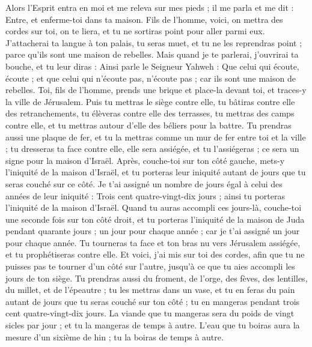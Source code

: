 \begin{multicols}{2}
Alors l'Esprit entra en moi et me releva sur mes pieds ; il me parla et me dit : Entre, et enferme-toi dans ta maison.
Fils de l’homme, voici, on mettra des cordes sur toi, on te liera, et tu ne sortiras point pour aller parmi eux.
J’attacherai ta langue à ton palais, tu seras muet, et tu ne les reprendras point ; parce qu'ils sont une maison de rebelles.
Mais quand je te parlerai, j'ouvrirai ta bouche, et tu leur diras : Ainsi parle le Seigneur Yahweh : Que celui qui écoute, écoute ; et que celui qui n'écoute pas, n'écoute pas ; car ils sont une maison de rebelles.
\VerseOne{}Toi, fils de l’homme, prends une brique et place-la devant toi, et traces-y la ville de Jérusalem.
Puis tu mettras le siège contre elle, tu bâtiras contre elle des retranchements, tu élèveras contre elle des terrasses, tu mettras des camps contre elle, et tu mettras autour d'elle des béliers pour la battre.
Tu prendras aussi une plaque de fer, et tu la mettras comme un mur de fer entre toi et la ville ; tu dresseras ta face contre elle, elle sera assiégée, et tu l'assiégeras ; ce sera un signe pour la maison d'Israël.
Après, couche-toi sur ton côté gauche, mets-y l'iniquité de la maison d'Israël, et tu porteras leur iniquité autant de jours que tu seras couché sur ce côté.
Je t'ai assigné un nombre de jours égal à celui des années de leur iniquité : Trois cent quatre-vingt-dix jours ; ainsi tu porteras l'iniquité de la maison d'Israël.
Quand tu auras accompli ces jours-là, couche-toi une seconde fois sur ton côté droit, et tu porteras l'iniquité de la maison de Juda pendant quarante jours ; un jour pour chaque année ; car je t'ai assigné un jour pour chaque année.
Tu tourneras ta face et ton bras nu vers Jérusalem assiégée, et tu prophétiseras contre elle.
Et voici, j'ai mis sur toi des cordes, afin que tu ne puisses pas te tourner d’un côté sur l'autre, jusqu'à ce que tu aies accompli les jours de ton siège.
Tu prendras aussi du froment, de l'orge, des fèves, des lentilles, du millet, et de l'épeautre ; tu les mettras dans un vase, et tu en feras du pain autant de jours que tu seras couché sur ton côté ; tu en mangeras pendant trois cent quatre-vingt-dix jours.
La viande que tu mangeras sera du poids de vingt sicles par jour ; et tu la mangeras de temps à autre.
L’eau que tu boiras aura la mesure d’un sixième de hin ; tu la boiras de temps à autre.

\end{multicols}
